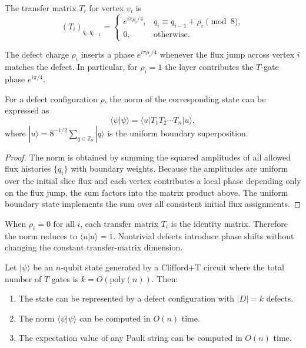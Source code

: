 \begin{definition}
The transfer matrix $T_i$ for vertex $v_i$ is
\begin{equation}
(T_i)_{q_i, q_{i-1}} =
\begin{cases}
e^{i\pi \rho_i / 4}, & q_i \equiv q_{i-1} + \rho_i \pmod{8}, \\
0, & \text{otherwise}.
\end{cases}
\end{equation}
\end{definition}

The defect charge $\rho_i$ inserts a phase $e^{i\pi \rho_i / 4}$ whenever the flux jump across vertex $i$ matches the defect. In particular, for $\rho_i = 1$ the layer contributes the $T$-gate phase $e^{i\pi/4}$.

\begin{lemma}
\label{lem:factorization}
For a defect configuration $\rho$, the norm of the corresponding state can be expressed as
\begin{equation}
\langle \psi | \psi \rangle = \langle u | T_1 T_2 \cdots T_n | u \rangle,
\end{equation}
where $|u\rangle = 8^{-1/2} \sum_{q \in \mathbb{Z}_8} |q\rangle$ is the uniform boundary superposition.
\end{lemma}

\begin{proof}
The norm is obtained by summing the squared amplitudes of all allowed flux histories $\{q_i\}$ with boundary weights. Because the amplitudes are uniform over the initial slice flux and each vertex contributes a local phase depending only on the flux jump, the sum factors into the matrix product above. The uniform boundary state implements the sum over all consistent initial flux assignments.
\end{proof}

\begin{remark}
When $\rho_i = 0$ for all $i$, each transfer matrix $T_i$ is the identity matrix. Therefore the norm reduces to $\langle u | u \rangle = 1$. Nontrivial defects introduce phase shifts without changing the constant transfer-matrix dimension.
\end{remark}

\begin{theorem}
\label{thm:1d-polynomial}
Let $|\psi\rangle$ be an $n$-qubit state generated by a Clifford+T circuit where the total number of $T$ gates is $k = O(\text{poly}(n))$. Then:
\begin{enumerate}
    \item The state can be represented by a defect configuration with $|D| = k$ defects.
    \item The norm $\langle\psi|\psi\rangle$ can be computed in $O(n)$ time.
    \item The expectation value of any Pauli string can be computed in $O(n)$ time.
\end{enumerate}
\end{theorem}

